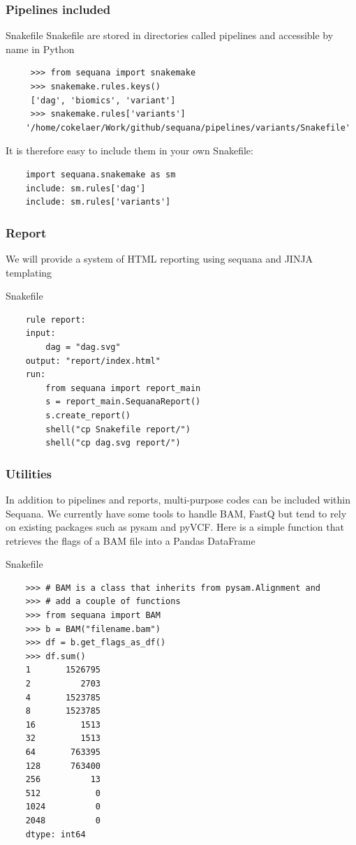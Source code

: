 \documentclass{beamer}
\begin{document}
\begin{frame}[fragile]
    \frametitle{Pipelines included}
    
    \begin{block}{Snakefile}
    Snakefile are stored in directories called pipelines and accessible by name in Python
    \begin{lstlisting}
     >>> from sequana import snakemake
     >>> snakemake.rules.keys()
     ['dag', 'biomics', 'variant']
     >>> snakemake.rules['variants']
    '/home/cokelaer/Work/github/sequana/pipelines/variants/Snakefile'
    \end{lstlisting}

    It is therefore easy to include them in your own Snakefile:
    \begin{lstlisting}
    import sequana.snakemake as sm
    include: sm.rules['dag']
    include: sm.rules['variants']
    \end{lstlisting}

    \end{block}
\end{frame}

\begin{frame}[fragile]
    \frametitle{Report}
    
    We will provide a system of HTML reporting using sequana and JINJA templating
    \begin{block}{Snakefile}
    \begin{lstlisting}
    rule report:
    input:
        dag = "dag.svg"
    output: "report/index.html"
    run:
        from sequana import report_main
        s = report_main.SequanaReport()
        s.create_report()
        shell("cp Snakefile report/")
        shell("cp dag.svg report/")    
    \end{lstlisting}
    \end{block}
\end{frame}


\begin{frame}[fragile]
    \frametitle{Utilities}
    
    \footnotesize
    In addition to pipelines and reports, multi-purpose codes can be included within Sequana. 
    We currently have some tools to handle BAM, FastQ but tend to rely on existing packages such as pysam and pyVCF.
    Here is a simple function that retrieves the flags of a BAM file into a Pandas DataFrame
    
    \begin{block}{Snakefile}
    \begin{lstlisting}
    >>> # BAM is a class that inherits from pysam.Alignment and 
    >>> # add a couple of functions
    >>> from sequana import BAM
    >>> b = BAM("filename.bam")
    >>> df = b.get_flags_as_df()
    >>> df.sum()
    1       1526795
    2          2703
    4       1523785
    8       1523785
    16         1513
    32         1513
    64       763395
    128      763400
    256          13
    512           0
    1024          0
    2048          0
    dtype: int64
    \end{lstlisting}
    \end{block}
\end{frame}
\end{document}
